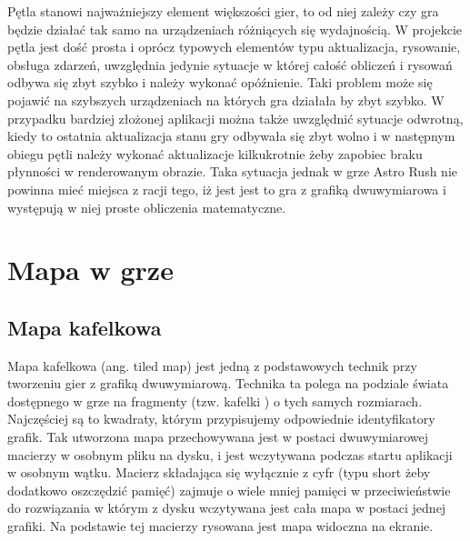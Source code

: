Pętla stanowi najważniejszy element większości gier, to od niej zależy czy gra będzie działać tak samo na urządzeniach różniących się wydajnością. W projekcie pętla jest dość prosta i oprócz typowych elementów typu aktualizacja, rysowanie, obsługa zdarzeń, uwzględnia jedynie sytuacje w której całość obliczeń i rysowań odbywa się zbyt szybko i należy wykonać opóźnienie. Taki problem może się pojawić na szybszych urządzeniach na których gra działała by zbyt szybko. W przypadku bardziej złożonej aplikacji można także uwzględnić sytuacje odwrotną, kiedy to ostatnia aktualizacja stanu gry odbywała się zbyt wolno i w następnym obiegu pętli należy wykonać aktualizacje kilkukrotnie żeby zapobiec braku płynności w renderowanym obrazie. Taka sytuacja jednak w grze Astro Rush nie powinna mieć miejsca z racji tego, iż jest jest to gra z grafiką dwuwymiarowa i występują w niej proste obliczenia matematyczne.


\section{Mapa w grze}

\subsection{Mapa kafelkowa}
Mapa kafelkowa (ang. tiled map) jest jedną z podstawowych technik przy tworzeniu gier z grafiką dwuwymiarową. Technika ta polega na podziale świata dostępnego w grze na fragmenty (tzw. kafelki ) o tych samych rozmiarach. Najczęściej są to kwadraty, którym przypisujemy odpowiednie identyfikatory grafik. Tak utworzona mapa przechowywana jest w postaci dwuwymiarowej macierzy w osobnym pliku na dysku, i jest wczytywana podczas startu aplikacji w osobnym wątku. Macierz składająca się wyłącznie z cyfr (typu short żeby dodatkowo oszczędzić pamięć) zajmuje o wiele mniej pamięci w przeciwieństwie do rozwiązania w którym  z dysku wczytywana jest cała mapa w postaci jednej grafiki. Na podstawie tej macierzy rysowana jest mapa widoczna na ekranie. 

